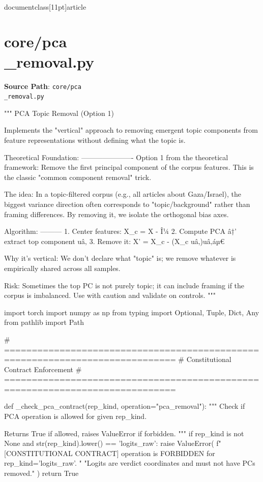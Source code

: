 \\documentclass[11pt]{article}
\begin{document}
\section*{core/pca\\_removal.py}
\textbf{Source Path}: \texttt{core/pca\\_removal.py}\par
\bigskip
\begin{CodeBlock}
"""
PCA Topic Removal (Option 1)

Implements the "vertical" approach to removing emergent topic components
from feature representations without defining what the topic is.

Theoretical Foundation:
----------------------
Option 1 from the theoretical framework: Remove the first principal component
of the corpus features. This is the classic "common component removal" trick.

The idea: In a topic-filtered corpus (e.g., all articles about Gaza/Israel),
the biggest variance direction often corresponds to "topic/background" rather
than framing differences. By removing it, we isolate the orthogonal bias axes.

Algorithm:
---------
1. Center features: X_c = X - Î¼
2. Compute PCA â†’ extract top component uâ‚
3. Remove it: X' = X_c - (X_c uâ‚)uâ‚áµ€

Why it's vertical: We don't declare what "topic" is; we remove whatever
is empirically shared across all samples.

Risk: Sometimes the top PC is not purely topic; it can include framing
if the corpus is imbalanced. Use with caution and validate on controls.
"""

import torch
import numpy as np
from typing import Optional, Tuple, Dict, Any
from pathlib import Path

# =============================================================================
# Constitutional Contract Enforcement
# =============================================================================

def _check_pca_contract(rep_kind, operation="pca_removal"):
    """
    Check if PCA operation is allowed for given rep_kind.
    
    Returns True if allowed, raises ValueError if forbidden.
    """
    if rep_kind is not None and str(rep_kind).lower() == 'logits_raw':
        raise ValueError(
            f"[CONSTITUTIONAL CONTRACT] {operation} is FORBIDDEN for rep_kind='logits_raw'. "
            "Logits are verdict coordinates and must not have PCs removed."
        )
    return True




\end{CodeBlock}
\end{document}
